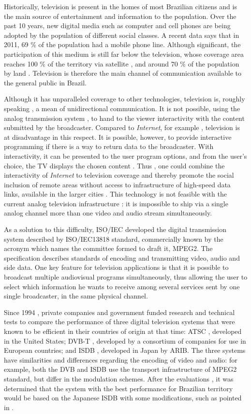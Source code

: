 \documentclass[
	12pt,				%
	openright,			%
	twoside,			%
	a4paper,			%
	brazil,
	french,				%
	english
	]{abntex2}
\begin{document}
Historically, television is present in the homes of most Brazilian citizens and is the main source of entertainment and information to the population. Over the past 10 years, new digital media such as computer and cell phones are being adopted by the population of different social classes. A recent data \cite{pnad2011} says that in 2011, 69 \% of the population had a mobile phone line. Although significant, the participation of this medium is still far below the television, whose coverage area reaches 100 \% of the territory via satellite \cite{StarOne}, and around 70 \% of the population by land \cite{forum_sbtvd}. Television is therefore the main channel of communication available to the general public in Brazil.

Although it has unparalleled coverage to other technologies, television is, roughly speaking , a mean of unidirectional communication. It is not possible, using the analog transmission system , to hand to the viewer interactivity with the content submitted by the broadcaster. Compared to \textit{Internet}, for example , television is at disadvantage in this respect. It is possible, however, to provide interactive programming if there is a way to return data to the broadcaster. With interactivity, it can be presented to the user program options, and from the user's choice, the TV displays the chosen content . Thus , one could combine the interactivity of \textit{Internet} to television coverage and thereby promote the social inclusion of remote areas without access to infrastructure of high-speed data links, available in the larger cities . This technology is not feasible with the current analog television infrastructure : it is impossible to ship via a single analog channel more than one video and audio stream simultaneously.

As a solution to this difficulty, ISO/IEC developed the digital transmission system described by ISO/IEC13818 standard, commercially known by the acronym which names the committee formed to draft it, MPEG2. The specification describes standards of encoding and transmitting video, audio and side data. One key feature for television applications is that it is possible to broadcast multiple audiovisual programs simultaneously, thus allowing the user to select which information he wants to receive among several services sent by one single broadcaster, in the same physical channel.

Since 1994 , private companies and government funded research and technical tests to compare the performance of three digital television systems that were known to be efficient in their countries of origin at that time: ATSC \cite{ATSC}, developed in the United States; DVB-T \cite{DVB}, developed by a consortium of companies for use in European countries; and ISDB , developed in Japan by ARIB\cite{ARIB}. The three systems have similarities and differences regarding the encoding of video and audio: for example, both the DVB and ISDB use the transport infrastructure of MPEG2 standard, but differ in the modulation schemes. After the evaluations , it was determined that the system with the best performance for Brazilian territory would be based on the Japanese ISDB with some modifications, such as pointed in \cite{SBTVD_diff_ISDB}.
\end{document}
